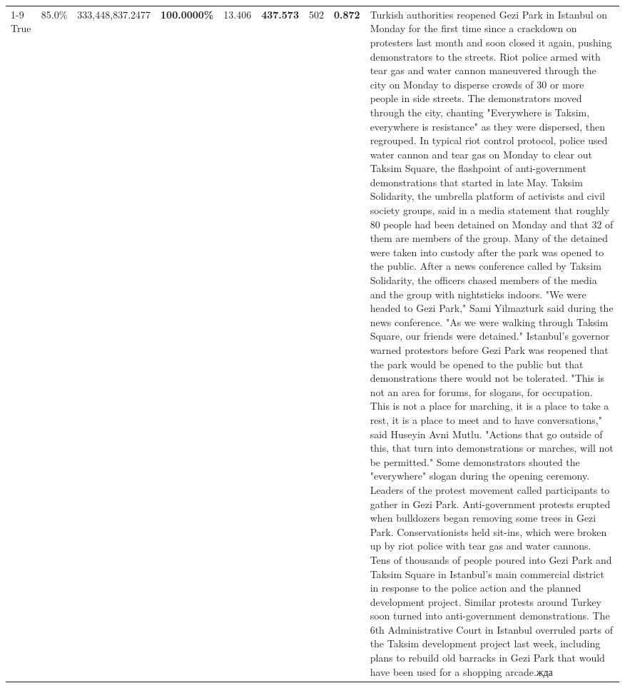 \begin{table}[H]
\begin{tabular}{lllrlllll}
\cline{1-9}
True & 85.0\% & 333,448,837.2477 & \bfseries \color{red} 100.0000\% & 13.406 & \bfseries \color{red} 437.573 & 502 & \bfseries \color{red} 0.872 & Turkish authorities reopened Gezi Park in Istanbul on Monday for the first time since a crackdown on protesters last month and soon closed it again, pushing demonstrators to the streets. Riot police armed with tear gas and water cannon maneuvered through the city on Monday to disperse crowds of 30 or more people in side streets. The demonstrators moved through the city, chanting "Everywhere is Taksim, everywhere is resistance" as they were dispersed, then regrouped. In typical riot control protocol, police used water cannon and tear gas on Monday to clear out Taksim Square, the flashpoint of anti-government demonstrations that started in late May. Taksim Solidarity, the umbrella platform of activists and civil society groups, said in a media statement that roughly 80 people had been detained on Monday and that 32 of them are members of the group. Many of the detained were taken into custody after the park was opened to the public. After a news conference called by Taksim Solidarity, the officers chased members of the media and the group with nightsticks indoors. "We were headed to Gezi Park," Sami Yilmazturk said during the news conference. "As we were walking through Taksim Square, our friends were detained." Istanbul's governor warned protestors before Gezi Park was reopened that the park would be opened to the public but that demonstrations there would not be tolerated. "This is not an area for forums, for slogans, for occupation. This is not a place for marching, it is a place to take a rest, it is a place to meet and to have conversations," said Huseyin Avni Mutlu. "Actions that go outside of this, that turn into demonstrations or marches, will not be permitted." Some demonstrators shouted the "everywhere" slogan during the opening ceremony. Leaders of the protest movement called participants to gather in Gezi Park. Anti-government protests erupted when bulldozers began removing some trees in Gezi Park. Conservationists held sit-ins, which were broken up by riot police with tear gas and water cannons. Tens of thousands of people poured into Gezi Park and Taksim Square in Istanbul's main commercial district in response to the police action and the planned development project. Similar protests around Turkey soon turned into anti-government demonstrations. The 6th Administrative Court in Istanbul overruled parts of the Taksim development project last week, including plans to rebuild old barracks in Gezi Park that would have been used for a shopping arcade.жда \\

\end{tabular}
\end{table}
